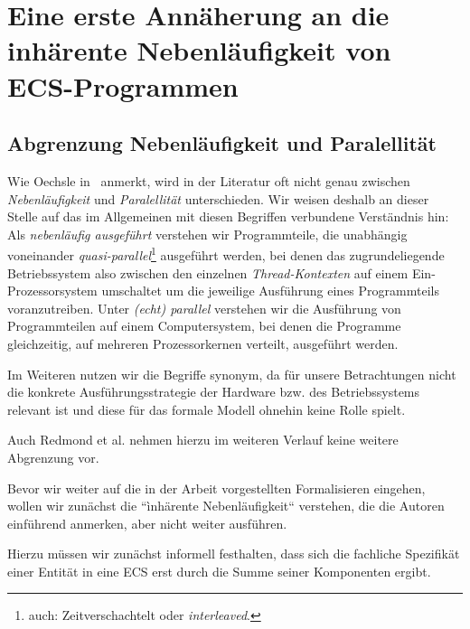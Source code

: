 \section{Eine erste Annäherung an die inhärente Nebenläufigkeit von ECS-Programmen}


\subsection*{Abgrenzung Nebenläufigkeit und Paralellität}
Wie Oechsle in~\cite{Oec22} anmerkt, wird in der Literatur oft nicht genau zwischen \textit{Nebenläufigkeit} und \textit{Paralellität} unterschieden.
Wir weisen deshalb an dieser Stelle auf das im Allgemeinen mit diesen Begriffen verbundene Verständnis hin: Als \textit{nebenläufig ausgeführt} verstehen wir Programmteile, die unabhängig voneinander \textit{quasi-parallel}\footnote{
    auch: Zeitverschachtelt oder \textit{interleaved}.
} ausgeführt werden, bei denen das zugrundeliegende Betriebssystem also zwischen den einzelnen \textit{Thread-Kontexten} auf einem Ein-Prozessorsystem umschaltet um die jeweilige Ausführung eines Programmteils voranzutreiben.
Unter \textit{(echt) parallel} verstehen wir die Ausführung von Programmteilen auf einem Computersystem, bei denen die Programme gleichzeitig, auf mehreren Prozessorkernen verteilt, ausgeführt werden.

Im Weiteren nutzen wir die Begriffe synonym, da für unsere Betrachtungen nicht die konkrete Ausführungsstrategie der Hardware bzw. des Betriebssystems relevant ist und diese für das formale Modell ohnehin keine Rolle spielt.

Auch Redmond et al. nehmen hierzu im weiteren Verlauf keine weitere Abgrenzung vor.


Bevor wir weiter auf die in der Arbeit vorgestellten Formalisieren eingehen, wollen wir zunächst die ``ìnhärente Nebenläufigkeit`` verstehen, die die Autoren einführend anmerken, aber nicht weiter ausführen.

Hierzu müssen wir zunächst informell festhalten, dass sich die fachliche Spezifikät einer Entität in eine ECS erst durch die Summe seiner Komponenten ergibt.


